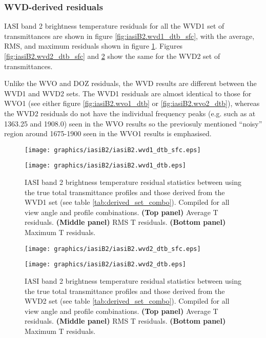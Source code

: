\subsubsection{WVD-derived residuals}
IASI band 2 brightness temperature residuals for all the WVD1 set of transmittances are shown in figure \ref{fig:iasiB2.wvd1_dtb_sfc}, with the average, RMS, and maximum residuals shown in figure \ref{fig:iasiB2.wvd1_dtb}. Figures \ref{fig:iasiB2.wvd2_dtb_sfc} and \ref{fig:iasiB2.wvd2_dtb} show the same for the WVD2 set of transmittances.

Unlike the WVO and DOZ residuals, the WVD results are different between the WVD1 and WVD2 sets. The WVD1 residuals are almost identical to those for WVO1 (see either figure \ref{fig:iasiB2.wvo1_dtb} or \ref{fig:iasiB2.wvo2_dtb}), whereas the WVD2 residuals do not have the individual frequency peaks (e.g. such as at 1363.25 and 1908.0\invcm{}) seen in the WVO results so the previosuly mentioned ``noisy'' region around 1675-1900\invcm{} seen in the WVO1 results is emphasised.
\begin{figure}[htp]
  \centering
  \texttt{[image: graphics/iasiB2/iasiB2.wvd1\_dtb\_sfc.eps]}
  \caption{IASI band 2 brightness temperature residuals for all view angles and profiles between using the true total transmittance profiles and those derived from the WVD1 set (see table \ref{tab:derived_set_combo})}
  \label{fig:iasiB2.wvd1_dtb_sfc}
  \vspace{1em}
  \texttt{[image: graphics/iasiB2/iasiB2.wvd1\_dtb.eps]}
  \caption{IASI band 2 brightness temperature residual statistics between using the true total transmittance profiles and those derived from the WVD1 set (see table \ref{tab:derived_set_combo}). Compiled for all view angle and profile combinations. \textbf{(Top panel)} Average T residuals. \textbf{(Middle panel)} RMS T residuals. \textbf{(Bottom panel)} Maximum T residuals.}
  \label{fig:iasiB2.wvd1_dtb}
\end{figure}
\begin{figure}[htp]
  \centering
  \texttt{[image: graphics/iasiB2/iasiB2.wvd2\_dtb\_sfc.eps]}
  \caption{IASI band 2 brightness temperature residuals for all view angles and profiles between using the true total transmittance profiles and those derived from the WVD2 set (see table \ref{tab:derived_set_combo})}
  \label{fig:iasiB2.wvd2_dtb_sfc}
  \vspace{1em}
  \texttt{[image: graphics/iasiB2/iasiB2.wvd2\_dtb.eps]}
  \caption{IASI band 2 brightness temperature residual statistics between using the true total transmittance profiles and those derived from the WVD2 set (see table \ref{tab:derived_set_combo}). Compiled for all view angle and profile combinations. \textbf{(Top panel)} Average T residuals. \textbf{(Middle panel)} RMS T residuals. \textbf{(Bottom panel)} Maximum T residuals.}
  \label{fig:iasiB2.wvd2_dtb}
\end{figure}
